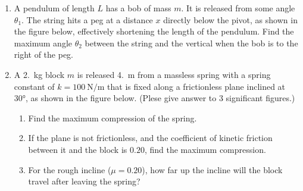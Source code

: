 \documentclass{../../../oss-apphys}
\begin{document}
\begin{enumerate}[leftmargin=15pt]
\item A pendulum of length $L$ has a bob of mass $m$. It is released from some
  angle $\theta_1$. The string hits a peg at a distance $x$ directly below the
  pivot, as shown in the figure below, effectively shortening the length of the
  pendulum. Find the maximum angle $\theta_2$ between the string and the
  vertical when the bob is to the right of the peg.
  \begin{center}
  \end{center}
  \vspace{\stretch1}
  \newpage
  
\item A \SI{2.}{\kilo\gram} block $m$ is released \SI{4.}{\metre} from a
  massless
  spring with a spring constant of $k=\SI{100}{\newton\per\metre}$ that is fixed
  along a frictionless plane inclined at \ang{30}, as shown in the figure below.
  (Plese give answer to $3$ significant figures.)
  \begin{center}
  \end{center}
  \begin{enumerate}[noitemsep,leftmargin=20pt]
  \item Find the maximum compression of the spring.
  \item If the plane is not frictionless, and the coefficient of kinetic
    friction between it and the block is $0.20$, find the maximum compression.
  \item For the rough incline ($\mu=0.20$), how far up the incline will the
    block travel after leaving the spring?
  \end{enumerate}
\end{enumerate}
\end{document}
